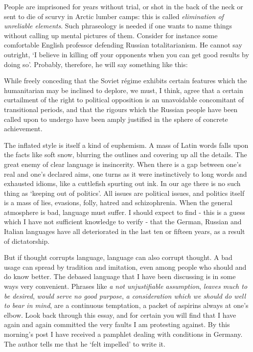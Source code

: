 People are imprisoned for years without trial, or shot in the back of the neck or sent to die of scurvy in Arctic lumber camps: this is called \textit{elimination of unreliable elements}. Such phraseology is needed if one wants to name things without calling up mental pictures of them. Consider for instance some comfortable English professor defending Russian totalitarianism. He cannot say outright, ‘I believe in killing off your opponents when you can get good results by doing so’. Probably, therefore, he will say something like this:\par

\begin{rquote}
While freely conceding that the Soviet régime exhibits certain features which the humanitarian may be inclined to deplore, we must, I think, agree that a certain curtailment of the right to political opposition is an unavoidable concomitant of transitional periods, and that the rigours which the Russian people have been called upon to undergo have been amply justified in the sphere of concrete achievement.
\end{rquote}

The inflated style is itself a kind of euphemism. A mass of Latin words falls upon the facts like soft snow, blurring the outlines and covering up all the details. The great enemy of clear language is insincerity. When there is a gap between one’s real and one’s declared aims, one turns as it were instinctively to long words and exhausted idioms, like a cuttlefish spurting out ink. In our age there is no such thing as ‘keeping out of politics’. All issues are political issues, and politics itself is a mass of lies, evasions, folly, hatred and schizophrenia. When the general atmosphere is bad, language must suffer. I should expect to find - this is a guess which I have not sufficient knowledge to verify - that the German, Russian and Italian languages have all deteriorated in the last ten or fifteen years, as a result of dictatorship.\par

But if thought corrupts language, language can also corrupt thought. A bad usage can spread by tradition and imitation, even among people who should and do know better. The debased language that I have been discussing is in some ways very convenient. Phrases like \textit{a not unjustifiable assumption}, \textit{leaves much to be desired}, \textit{would serve no good purpose}, \textit{a consideration which we should do well to bear in mind}, are a continuous temptation, a packet of aspirins always at one’s elbow. Look back through this essay, and for certain you will find that I have again and again committed the very faults I am protesting against. By this morning’s post I have received a pamphlet dealing with conditions in Germany. The author tells me that he ‘felt impelled’ to write it.\par

